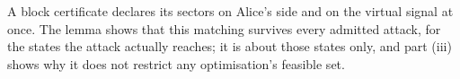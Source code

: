 
A block certificate declares its sectors on Alice's side and on the virtual
signal at once. The lemma shows that this matching survives every admitted
attack, for the states the attack actually reaches; it is about those states
only, and part (iii) shows why it does not restrict any optimisation's
feasible set.


